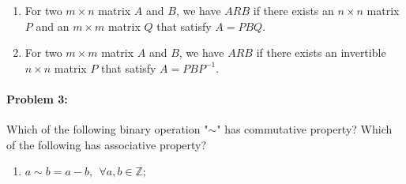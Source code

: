 \documentclass[12pt]{scrartcl}
\begin{document}
{{\begin{enumerate}[label=\textbf{\arabic*)}]
{\begin{minipage}{0.9\textwidth}
		~~~Commutative Property: $$A=PBQ \Longrightarrow B=PAQ$$
	
		~~~Associative Property: $$B=PAQ, C=PBQ \Longrightarrow C=PAQ$$
	\end{minipage}}

	\item For two $m \times n$ matrix $A$ and $B$, we have $ARB$ if there exists an $n \times n$ matrix $P$ and an $m \times m$ matrix $Q$ that satisfy $A=PBQ$.


	\item For two $m \times m$ matrix $A$ and $B$, we have $ARB$ if there exists an invertible $n \times n$ matrix $P$ that satisfy $A=PBP^{-1}$.


	\end{enumerate}

\newpage

\paragraph*{Problem 3: } Which of the following binary operation "$\sim$" has commutative property? Which of the following has associative property?

	\begin{enumerate}[label=\arabic*)]

	\item $a \sim b = a - b, ~~\forall a, b \in \mathbb{Z};$


\end{enumerate}}}
\end{document}
